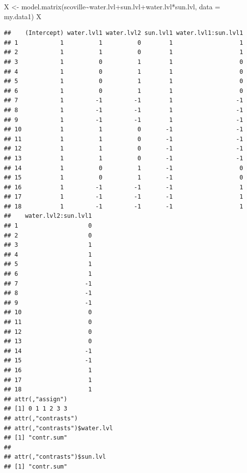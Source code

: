 \documentclass[
]{book}
\newenvironment{Shaded}{\begin{snugshade}}{\end{snugshade}}
\newcommand{\AttributeTok}[1]{\textcolor[rgb]{0.77,0.63,0.00}{#1}}
\newcommand{\FunctionTok}[1]{\textcolor[rgb]{0.00,0.00,0.00}{#1}}
\newcommand{\NormalTok}[1]{#1}
\newcommand{\OtherTok}[1]{\textcolor[rgb]{0.56,0.35,0.01}{#1}}
\newcommand{\SpecialCharTok}[1]{\textcolor[rgb]{0.00,0.00,0.00}{#1}}
\begin{document}
\begin{Shaded}
\begin{Highlighting}[]
\NormalTok{X }\OtherTok{\textless{}{-}} \FunctionTok{model.matrix}\NormalTok{(scoville}\SpecialCharTok{\textasciitilde{}}\NormalTok{water.lvl}\SpecialCharTok{+}\NormalTok{sun.lvl}\SpecialCharTok{+}\NormalTok{water.lvl}\SpecialCharTok{*}\NormalTok{sun.lvl, }\AttributeTok{data =}\NormalTok{ my.data1)}
\NormalTok{X}
\end{Highlighting}
\end{Shaded}

\begin{verbatim}
##    (Intercept) water.lvl1 water.lvl2 sun.lvl1 water.lvl1:sun.lvl1
## 1            1          1          0        1                   1
## 2            1          1          0        1                   1
## 3            1          0          1        1                   0
## 4            1          0          1        1                   0
## 5            1          0          1        1                   0
## 6            1          0          1        1                   0
## 7            1         -1         -1        1                  -1
## 8            1         -1         -1        1                  -1
## 9            1         -1         -1        1                  -1
## 10           1          1          0       -1                  -1
## 11           1          1          0       -1                  -1
## 12           1          1          0       -1                  -1
## 13           1          1          0       -1                  -1
## 14           1          0          1       -1                   0
## 15           1          0          1       -1                   0
## 16           1         -1         -1       -1                   1
## 17           1         -1         -1       -1                   1
## 18           1         -1         -1       -1                   1
##    water.lvl2:sun.lvl1
## 1                    0
## 2                    0
## 3                    1
## 4                    1
## 5                    1
## 6                    1
## 7                   -1
## 8                   -1
## 9                   -1
## 10                   0
## 11                   0
## 12                   0
## 13                   0
## 14                  -1
## 15                  -1
## 16                   1
## 17                   1
## 18                   1
## attr(,"assign")
## [1] 0 1 1 2 3 3
## attr(,"contrasts")
## attr(,"contrasts")$water.lvl
## [1] "contr.sum"
## 
## attr(,"contrasts")$sun.lvl
## [1] "contr.sum"
\end{verbatim}
\end{document}
